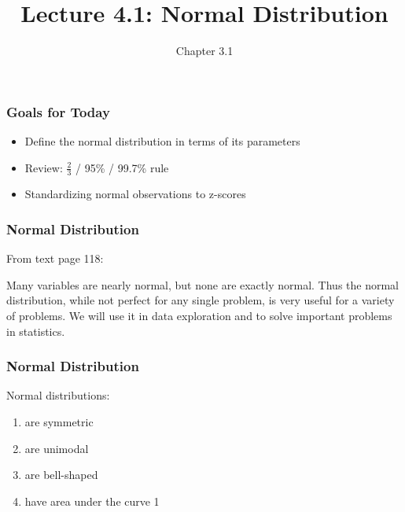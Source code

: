 \documentclass[slides]{beamer}
\title{Lecture 4.1: Normal Distribution}
\author{Chapter 3.1}
\date{}
\newcommand{\blue}[1]{\textcolor{blue2}{#1}}
\begin{document}
\begin{frame}
\titlepage
\end{frame}




\begin{frame}
\frametitle{Goals for Today}

\begin{itemize}
\item Define the normal distribution in terms of its \blue{parameters}
\item Review: $\frac{2}{3}$ / 95\% / 99.7\% rule
\item Standardizing normal observations to \blue{z-scores}
\end{itemize}


\end{frame}


\begin{frame}[fragile]
\frametitle{Normal Distribution}
From text page 118:

\vspace{0.5cm}

Many variables are nearly normal, but none are exactly normal. Thus the normal
distribution, while not perfect for any single problem, is very useful for a variety
of problems. We will use it in data exploration and to solve important problems
in statistics.
\end{frame}



\begin{frame}[fragile]
\frametitle{Normal Distribution}
Normal distributions:
\begin{enumerate}
\item are symmetric
\item are unimodal
\item are bell-shaped
\item have area under the curve 1
\end{enumerate}

\end{frame}
\end{document}
